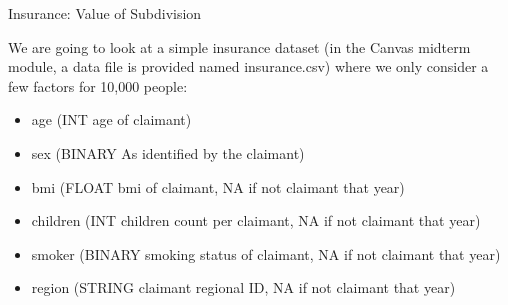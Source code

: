 \documentclass[12pt]{exam}
\begin{document}
\begin{questions}




\question[40] Insurance: Value of Subdivision
\addpoints

We are going to look at a simple insurance dataset (in the Canvas midterm module, a data file is provided named insurance.csv) where we only consider a few factors for 10,000 people: 

\begin{itemize}
    \item age (INT age of claimant)
    \item sex (BINARY As identified by the claimant)
    \item bmi (FLOAT bmi of claimant, NA if not claimant that year)
    \item children (INT children count per claimant, NA if not claimant that year)
    \item smoker (BINARY smoking status of claimant, NA if not claimant that year)
    \item region (STRING claimant regional ID, NA if not claimant that year)
\end{itemize}


\end{questions}
\end{document}
